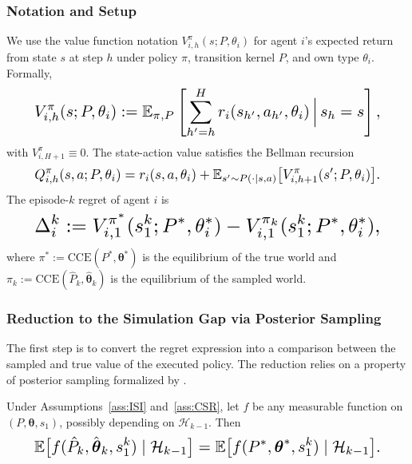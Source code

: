 \subsubsection{Notation and Setup}

We use the value function notation $V_{i,h}^\pi(s; P, \theta_i)$ for agent $i$'s expected return from state $s$ at step $h$ under policy $\pi$, transition kernel $P$, and own type $\theta_i$. Formally,
\begin{equation}\resizebox{0.9\linewidth}{!}{$\displaystyle V_{i,h}^\pi(s; P, \theta_i) := \mathbb{E}_{\pi, P}\left[\sum_{h'=h}^{H} r_i(s_{h'}, a_{h'}, \theta_i) \,\Big|\, s_h = s\right], $}\end{equation}
with $V_{i,H+1}^\pi \equiv 0$. The state-action value satisfies the Bellman recursion
\begin{equation}\resizebox{0.9\linewidth}{!}{$\displaystyle Q_{i,h}^\pi(s, a; P, \theta_i) = r_i(s, a, \theta_i) + \mathbb{E}_{s' \sim P(\cdot \mid s, a)}\big[V_{i,h+1}^\pi(s'; P, \theta_i)\big]. $}\end{equation}
The episode-$k$ regret of agent $i$ is
\begin{equation}\label{eq:Delta-def}\resizebox{0.9\linewidth}{!}{$\displaystyle \Delta_i^k := V_{i,1}^{\pi^*}(s_1^k; P^*, \theta_i^*) - V_{i,1}^{\pi_k}(s_1^k; P^*, \theta_i^*), $}\end{equation}
where $\pi^* := \mathrm{CCE}(P^*, \boldsymbol{\theta}^*)$ is the equilibrium of the true world and $\pi_k := \mathrm{CCE}(\hat{P}_k, \hat{\boldsymbol{\theta}}_k)$ is the equilibrium of the sampled world.

\subsubsection{Reduction to the Simulation Gap via Posterior Sampling}

The first step is to convert the regret expression into a comparison between the sampled and true value of the executed policy. The reduction relies on a property of posterior sampling formalized by \citet{russo2014learning,osband2017posterior}.

\begin{lemma}
\label{lem:ps-equivalence}
Under Assumptions~\ref{ass:ISI} and~\ref{ass:CSR}, let $f$ be any measurable function on $(P, \boldsymbol{\theta}, s_1)$, possibly depending on $\mathcal{H}_{k-1}$. Then
\begin{equation}\resizebox{0.9\linewidth}{!}{$\displaystyle \mathbb{E}\big[f(\hat{P}_k, \hat{\boldsymbol{\theta}}_k, s_1^k) \mid \mathcal{H}_{k-1}\big] = \mathbb{E}\big[f(P^*, \boldsymbol{\theta}^*, s_1^k) \mid \mathcal{H}_{k-1}\big]. $}\end{equation}
\end{lemma}

